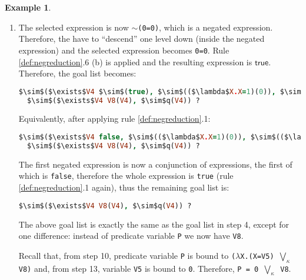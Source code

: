 \documentclass[inscr,ack,preface]{dithesis}
\theoremstyle{definition}
\newtheorem{example}{Example}[chapter]
\newcommand{\msf}[1]{$\mathsf{#1}$}
\begin{document}
\begin{example}
\begin{enumerate}
Furthermore, we reduce the first lambda expression of the completed expression:
\begin{lstlisting}[language=Prolog,%
  frame=single,breaklines=false,mathescape=true]
  $\sim$($\exists$V4 $\sim$(0=0), $\sim$(($\lambda$X.X=1)(0)), $\sim$(($\lambda$X.X=2)(0))),
  $\sim$($\exists$V4 V8(V4), $\sim$q(V4)) ?
\end{lstlisting}

\item The selected expression is now \texttt{$\sim$(0=0)}, which is a negated expression. Therefore, the have to ``descend'' one level down (inside the negated expression) and the selected expression becomes \texttt{0=0}. Rule \ref{def:negreduction}.6 (b) is applied and the resulting expression is \msf{true}. Therefore, the goal list becomes:
\begin{lstlisting}[language=Prolog,%
  frame=single,breaklines=false,mathescape=true]
  $\sim$($\exists$V4 $\sim$(true), $\sim$(($\lambda$X.X=1)(0)), $\sim$(($\lambda$X.X=2)(0))),
  $\sim$($\exists$V4 V8(V4), $\sim$q(V4)) ?
\end{lstlisting}

Equivalently, after applying rule \ref{def:negreduction}.1:
\begin{lstlisting}[language=Prolog,%
  frame=single,breaklines=false,mathescape=true]
  $\sim$($\exists$V4 false, $\sim$(($\lambda$X.X=1)(0)), $\sim$(($\lambda$X.X=2)(0))),
  $\sim$($\exists$V4 V8(V4), $\sim$q(V4)) ?
\end{lstlisting}

The first negated expression is now a conjunction of expressions, the first of which is \texttt{false}, therefore the whole expression is \texttt{true} (rule \ref{def:negreduction}.1 again), thus the remaining goal list is:
\begin{lstlisting}[language=Prolog,%
  frame=single,breaklines=false,mathescape=true]
  $\sim$($\exists$V4 V8(V4), $\sim$q(V4)) ?
\end{lstlisting}

The above goal list is exactly the same as the goal list in step 4, except for one difference: instead of predicate variable \texttt{P} we now have \texttt{V8}.

Recall that, from step 10, predicate variable \texttt{P} is bound to \texttt{($\lambda$X.(X=V5) $\bigvee_{\kappa}$ V8)} and, from step 13, variable \texttt{V5} is bound to \texttt{0}. Therefore, \texttt{P = 0 $\bigvee_{\kappa}$ V8}.

\end{enumerate}
\end{example}
\end{document}
